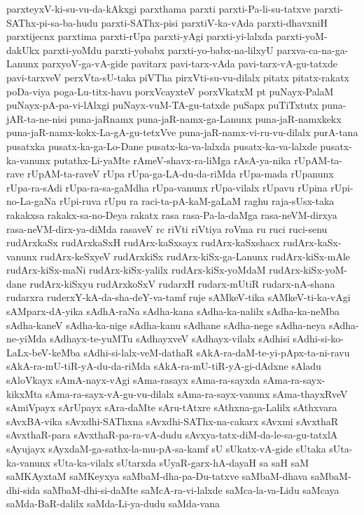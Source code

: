 {parxteyxV-ki-su-vu-da-kAkxgi
parxthama
parxti
parxti-Pa-li-su-tatxve
parxti-SAThx-pi-sa-ba-hudu
parxti-SAThx-pisi
parxtiV-ka-vAda
parxti-dhavxniH
parxtijecnx
parxtima
parxti-rUpa
parxti-yAgi
parxti-yi-lalxda
parxti-yoM-dakUkx
parxti-yoMdu
parxti-yobabx
parxti-yo-babx-na-lilxyU
parxva-ca-na-ga-Lanunx
parxyoV-ga-vA-gide
pavitarx
pavi-tarx-vAda
pavi-tarx-vA-gu-tatxde
pavi-tarxveV
perxVta-sU-taka
piVTha
pirxVti-su-vu-dilalx
pitatx
pitatx-rakatx
poDa-viya
poga-Lu-titx-havu
porxVcayxteV
porxVkatxM
pt
puNayx-PalaM
puNayx-pA-pa-vi-lAlxgi
puNayx-vuM-TA-gu-tatxde
puSapx
puTiTxtutx
puna-jAR-ta-ne-nisi
puna-jaRnamx
puna-jaR-namx-ga-Lanunx
puna-jaR-namxkekx
puna-jaR-namx-kokx-La-gA-gu-tetxVve
puna-jaR-namx-vi-ru-vu-dilalx
purA-tana
pusatxka
pusatx-ka-ga-Lo-Dane
pusatx-ka-va-lalxda
pusatx-ka-va-lalxde
pusatx-ka-vanunx
putathx-Li-yaMte
rAmeV-shavx-ra-liMga
rAsA-ya-nika
rUpAM-ta-rave
rUpAM-ta-raveV
rUpa
rUpa-ga-LA-du-da-riMda
rUpa-mada
rUpanunx
rUpa-ra-sAdi
rUpa-ra-sa-gaMdha
rUpa-vanunx
rUpa-vilalx
rUpavu
rUpina
rUpi-no-La-gaNa
rUpi-ruva
rUpu
ra
raci-ta-pA-kaM-gaLaM
raghu
raja-sUsx-taka
rakakxsa
rakakx-sa-no-Deya
rakatx
rasa
rasa-Pa-la-daMga
rasa-neVM-dirxya
rasa-neVM-dirx-ya-diMda
rasaveV
rc
riVti
riVtiya
roVma
ru
ruci
ruci-senu
rudArxkaSx
rudArxkaSxH
rudArx-kaSxsayx
rudArx-kaSxshacx
rudArx-kaSx-vanunx
rudArx-keSxyeV
rudArxkiSx
rudArx-kiSx-ga-Lanunx
rudArx-kiSx-mAle
rudArx-kiSx-maNi
rudArx-kiSx-yalilx
rudArx-kiSx-yoMdaM
rudArx-kiSx-yoM-dane
rudArx-kiSxyu
rudArxkoSxV
rudarxH
rudarx-mUtiR
rudarx-nA-shana
rudarxra
ruderxY-kA-da-sha-deY-va-tamf
ruje
sAMkeV-tika
sAMkeV-ti-ka-vAgi
sAMparx-dA-yika
sAdhA-raNa
sAdha-kana
sAdha-ka-nalilx
sAdha-ka-neMba
sAdha-kaneV
sAdha-ka-nige
sAdha-kanu
sAdhane
sAdha-nege
sAdha-neya
sAdha-ne-yiMda
sAdhayx-te-yuMTu
sAdhayxveV
sAdhayx-vilalx
sAdhisi
sAdhi-si-ko-LaLx-beV-keMba
sAdhi-si-lalx-veM-dathaR
sAkA-ra-daM-te-yi-pApx-ta-ni-ravu
sAkA-ra-mU-tiR-yA-du-da-riMda
sAkA-ra-mU-tiR-yA-gi-dAdxne
sAladu
sAloVkayx
sAmA-nayx-vAgi
sAma-rasayx
sAma-ra-sayxda
sAma-ra-sayx-kikxMta
sAma-ra-sayx-vA-gu-vu-dilalx
sAma-ra-sayx-vanunx
sAma-thayxRveV
sAmiVpayx
sArUpayx
sAra-daMte
sAru-tAtxre
sAthxna-ga-Lalilx
sAthxvara
sAvxBA-vika
sAvxdhi-SAThxna
sAvxdhi-SAThx-na-cakarx
sAvxmi
sAvxthaR
sAvxthaR-para
sAvxthaR-pa-ra-vA-dudu
sAvxya-tatx-diM-da-le-sa-gu-tatxlA
sAyujayx
sAyxdaM-ga-sathx-la-mu-pA-sa-kamf
sU
sUkatx-vA-gide
sUtaka
sUta-ka-vanunx
sUta-ka-vilalx
sUtarxda
sUyaR-garx-hA-dayaH
sa
saH
saM
saMKAyxtaM
saMKeyxya
saMbaM-dha-pa-Du-tatxve
saMbaM-dhava
saMbaM-dhi-sida
saMbaM-dhi-si-daMte
saMcA-ra-vi-lalxde
saMca-la-va-Lidu
saMcaya
saMda-BaR-dalilx
saMda-Li-ya-dudu
saMda-vana
}

